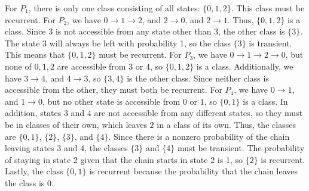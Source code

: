 \documentclass{homework}
\begin{document}
	
	\begin{alphaparts}
		\questionpart For $P_1$, there is only one class consisting of all states: $\{0, 1, 2\}$. This class must be recurrent.
		\questionpart For $P_2$, we have $0 \to 1 \to 2$, and $2 \to 0$, and $2\to 1$. Thus, $\{0,1,2\}$ is a class. Since $3$ is not accessible from any state other than 3, the other class is $\{3\}$. The state 3 will always be left with probability 1, so the class $\{3\}$ is transient. This means that $\{0,1,2\}$ must be recurrent.
		\questionpart For $P_3$, we have $0 \to 1 \to 2 \to 0$, but none of $0, 1,2$ are accessible from $3$ or $4$, so $\{0,1,2\}$ is a class. Additionally, we have $3\to 4$, and $4 \to 3$, so $\{3,4\}$ is the other class. Since neither class is accessible from the other, they must both be recurrent.
		\questionpart For $P_4$, we have $0 \to 1$, and $1 \to 0$, but no other state is accessible from $0$ or $1$, so $\{0,1\}$ is a class. In addition, states $3$ and $4$ are not accessible from any different states, so they must be in classes of their own, which leaves $2$ in a class of its own. Thus, the classes are $\{0,1\}$, $\{2\}$, $\{3\}$, and $\{4\}$. Since there is a nonzero probability of the chain leaving states $3$ and $4$, the classes $\{3\}$ and $\{4\}$ must be transient. The probability of staying in state 2 given that the chain starts in state 2 is 1, so $\{2\}$ is recurrent. Lastly, the class $\{0,1\}$ is recurrent because the probability that the chain leaves the class is 0.
	\end{alphaparts}
	
\end{document}
